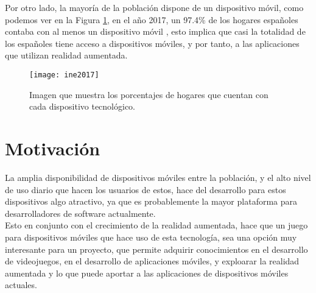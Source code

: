 Por otro lado, la mayoría de la población dispone de un dispositivo móvil, como podemos ver en la Figura \ref{figura-ine}, en el año 2017, un 97.4\% de los hogares españoles contaba con al menos un dispositivo móvil \cite{ine}, esto implica que casi la totalidad de los españoles tiene acceso a dispositivos móviles, y por tanto, a las aplicaciones que utilizan realidad aumentada.

\begin{figure}[h]
  \centering
  \texttt{[image: ine2017]}
  \caption{Imagen que muestra los porcentajes de hogares que cuentan con cada dispositivo tecnológico.\protect\footnotemark}
  \label{figura-ine}
\end{figure}


\newpage

\section{Motivación}
La amplia disponibilidad de dispositivos móviles entre la población, y el alto nivel de uso diario que hacen los usuarios de estos, hace del desarrollo para estos dispositivos algo atractivo, ya que es probablemente la mayor plataforma para desarrolladores de software actualmente.\\

Esto en conjunto con el crecimiento de la realidad aumentada, hace que un juego para dispositivos móviles que hace uso de esta tecnología, sea una opción muy interesante para un proyecto, que permite adquirir conocimientos en el desarrollo de videojuegos, en el desarrollo de aplicaciones móviles, y exploarar la realidad aumentada y lo que puede aportar a las aplicaciones de dispositivos móviles actuales.


